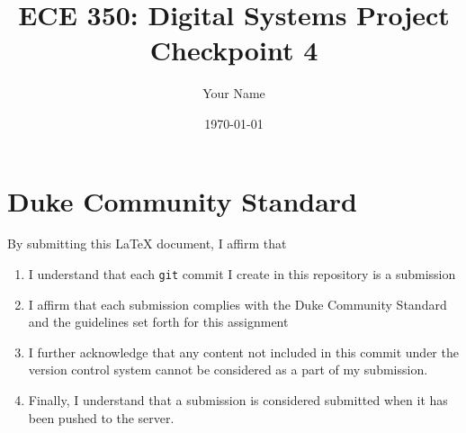 \documentclass[letterpaper]{article} %
\begin{document}
\title{ECE 350: Digital Systems Project Checkpoint 4}
\author{Your Name} %
\date{\today} %
\maketitle

\section*{Duke Community Standard}

By submitting this \LaTeX{} document, I affirm that
\begin{enumerate}
    \item I understand that each \texttt{git} commit I create in this repository is a submission
    \item I affirm that each submission complies with the Duke Community Standard and the guidelines set forth for this assignment
    \item I further acknowledge that any content not included in this commit under the version control system cannot be considered as a part of my submission.
    \item Finally, I understand that a submission is considered submitted when it has been pushed to the server.
\end{enumerate}
\end{document}

